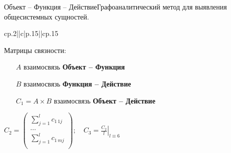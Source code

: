 \begin{frame}{Объект -- Функция -- Действие}{\small Графоаналитический метод для выявления общесистемных сущностей.}
\begin{tabular}{cp{.2\textwidth}||c|p{.15\textwidth}||cp{.15\textwidth}}
\end{tabular}
    \begin{minipage}[t]{0.4\linewidth}
        \centering
            Матрицы связности: 
            \begin{itemize}
                \item[$A$] взаимосвязь \textbf{Объект -- Функция} \pause
                \item[$B$] взаимосвязь \textbf{Функция -- Действие} \pause
                \item[$C_1 = A \times B$] взаимосвязь \textbf{Объект -- Действие} \pause
            \end{itemize}
    \end{minipage}
    \hfill
    \begin{minipage}[t]{0.55\linewidth}
        \vspace{1pt} $C_2 = \begin{pmatrix} \sum_{j=1}^l c_{1\,1j} \\ \ldots \\ \sum_{j=1}^l c_{1\,mj} \\ \end{pmatrix}\!; \quad C_3 = \left. \frac{C_2}{l} \right|_{l \equiv 6}$
    \end{minipage}
\end{frame}

